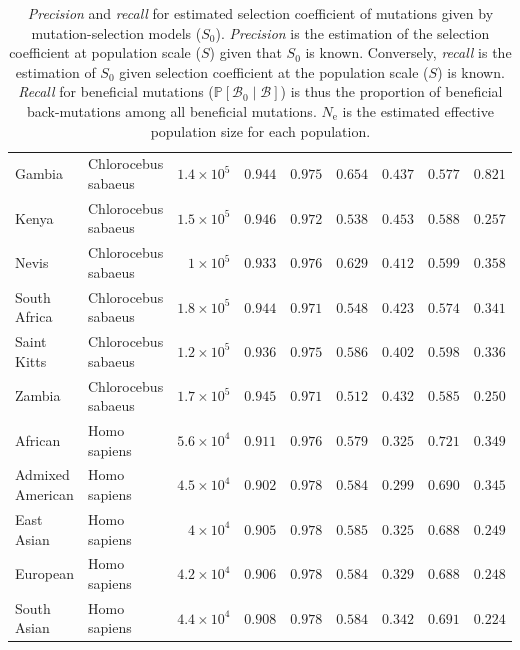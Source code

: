 \documentclass{article}
\newcommand{\Ne}{N_{\text{e}}}
\newcommand{\proba}{\mathbb{P}}
\newcommand{\Sphy}{S_{0}}
\newcommand{\SphyBen}{\mathcal{B}_0}
\newcommand{\given}{\mid}
\newcommand{\Spop}{S}
\newcommand{\SpopBen}{\mathcal{B}}
\begin{document}
\begin{table}[tb]
\begin{adjustbox}{width=\textwidth}
\begin{tabular}{||l|l|r||r|r||r|r||r|r||}
                \rowcolor{LIGHTGREY} Gambia & Chlorocebus sabaeus & $1.4\times 10^{5}$ & $ 0.944$ & $ 0.975$ & $ 0.654$ & $ 0.437$ & $ 0.577$ & $ 0.821$ \\
                \rowcolor{LIGHTGREY} Kenya & Chlorocebus sabaeus & $1.5\times 10^{5}$ & $ 0.946$ & $ 0.972$ & $ 0.538$ & $ 0.453$ & $ 0.588$ & $ 0.257$ \\
                \rowcolor{LIGHTGREY} Nevis & Chlorocebus sabaeus & $ 1\times 10^{5}$ & $ 0.933$ & $ 0.976$ & $ 0.629$ & $ 0.412$ & $ 0.599$ & $ 0.358$ \\
                \rowcolor{LIGHTGREY} South Africa & Chlorocebus sabaeus & $1.8\times 10^{5}$ & $ 0.944$ & $ 0.971$ & $ 0.548$ & $ 0.423$ & $ 0.574$ & $ 0.341$ \\
                \rowcolor{LIGHTGREY} Saint Kitts & Chlorocebus sabaeus & $1.2\times 10^{5}$ & $ 0.936$ & $ 0.975$ & $ 0.586$ & $ 0.402$ & $ 0.598$ & $ 0.336$ \\
                \rowcolor{LIGHTGREY} Zambia & Chlorocebus sabaeus & $1.7\times 10^{5}$ & $ 0.945$ & $ 0.971$ & $ 0.512$ & $ 0.432$ & $ 0.585$ & $ 0.250$ \\
                African & Homo sapiens & $5.6\times 10^{4}$ & $ 0.911$ & $ 0.976$ & $ 0.579$ & $ 0.325$ & $ 0.721$ & $ 0.349$ \\
                Admixed American & Homo sapiens & $4.5\times 10^{4}$ & $ 0.902$ & $ 0.978$ & $ 0.584$ & $ 0.299$ & $ 0.690$ & $ 0.345$ \\
                East Asian & Homo sapiens & $ 4\times 10^{4}$ & $ 0.905$ & $ 0.978$ & $ 0.585$ & $ 0.325$ & $ 0.688$ & $ 0.249$ \\
                European & Homo sapiens & $4.2\times 10^{4}$ & $ 0.906$ & $ 0.978$ & $ 0.584$ & $ 0.329$ & $ 0.688$ & $ 0.248$ \\
                South Asian & Homo sapiens & $4.4\times 10^{4}$ & $ 0.908$ & $ 0.978$ & $ 0.584$ & $ 0.342$ & $ 0.691$ & $ 0.224$ \\
                \bottomrule
            \end{tabular}
        \end{adjustbox}
        \caption{
            \textit{Precision} and \textit{recall} for estimated selection coefficient of mutations given by mutation-selection models ($\Sphy$).
            \textit{Precision} is the estimation of the selection coefficient at population scale ($\Spop$) given that $\Sphy$ is known.
            Conversely, \textit{recall} is the estimation of $\Sphy$ given selection coefficient at the population scale ($\Spop$) is known.
            \textit{Recall} for beneficial mutations ($\proba [\SphyBen \given \SpopBen]$) is thus the proportion of beneficial back-mutations among all beneficial mutations.
            $\Ne$ is the estimated effective population size for each population.
        }
        \label{table:proba}
    \end{table}
\end{document}
